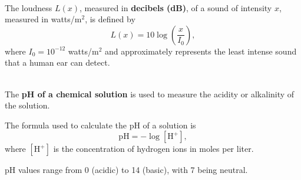 \begin{myDefinition}[Key Characteristics of $\boldsymbol{f(t) = ae^{kt}}$:]
\begin{minipage}{0.4\linewidth}
\begin{center}
				\label{fig:explog-def2}
				\end{center}

	\end{minipage}
\end{myDefinition}



\newpage

\begin{myDefinition}[Decibels]~\\[0.5mm]
The loudness $L(x)$, measured in {\bf decibels (dB)}, of a sound of intensity $x$, measured in watts/m$^2$, is defined by $$L(x) = 10 \log \left( \frac{x}{I_0} \right),$$ where $I_0 = 10^{-12}$ watts/m$^2$ and approximately represents the least intense sound that a human ear can detect.
\end{myDefinition}

\begin{myDefinition}[pH]~\\[0.5mm]
The {\bf pH of a chemical solution} is used to measure the acidity or alkalinity of the solution.  

The formula used to calculate the pH of a solution is $$\text{pH}=-\log\left[\text{H}^+\right],$$ where $\left[\text{H}^+\right]$ is the concentration of hydrogen ions in moles per liter. 

pH values range from 0 (acidic) to 14 (basic), with 7 being neutral.
\end{myDefinition}


